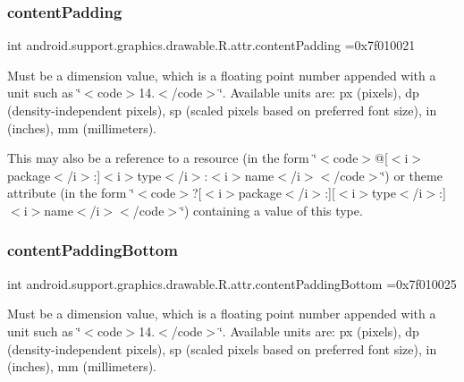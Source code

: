 \subsubsection{\texorpdfstring{content\+Padding}{contentPadding}}
{\footnotesize\ttfamily int android.\+support.\+graphics.\+drawable.\+R.\+attr.\+content\+Padding =0x7f010021\hspace{0.3cm}{\ttfamily [static]}}

Must be a dimension value, which is a floating point number appended with a unit such as \char`\"{}$<$code$>$14.\+5sp$<$/code$>$\char`\"{}. Available units are\+: px (pixels), dp (density-\/independent pixels), sp (scaled pixels based on preferred font size), in (inches), mm (millimeters). 

This may also be a reference to a resource (in the form \char`\"{}$<$code$>$@\mbox{[}$<$i$>$package$<$/i$>$\+:\mbox{]}$<$i$>$type$<$/i$>$\+:$<$i$>$name$<$/i$>$$<$/code$>$\char`\"{}) or theme attribute (in the form \char`\"{}$<$code$>$?\mbox{[}$<$i$>$package$<$/i$>$\+:\mbox{]}\mbox{[}$<$i$>$type$<$/i$>$\+:\mbox{]}$<$i$>$name$<$/i$>$$<$/code$>$\char`\"{}) containing a value of this type. \mbox{\label{classandroid_1_1support_1_1graphics_1_1drawable_1_1R_1_1attr_ac4f86ab3e5d1661a607c22af1609d03f}} 
\subsubsection{\texorpdfstring{content\+Padding\+Bottom}{contentPaddingBottom}}
{\footnotesize\ttfamily int android.\+support.\+graphics.\+drawable.\+R.\+attr.\+content\+Padding\+Bottom =0x7f010025\hspace{0.3cm}{\ttfamily [static]}}

Must be a dimension value, which is a floating point number appended with a unit such as \char`\"{}$<$code$>$14.\+5sp$<$/code$>$\char`\"{}. Available units are\+: px (pixels), dp (density-\/independent pixels), sp (scaled pixels based on preferred font size), in (inches), mm (millimeters). 

